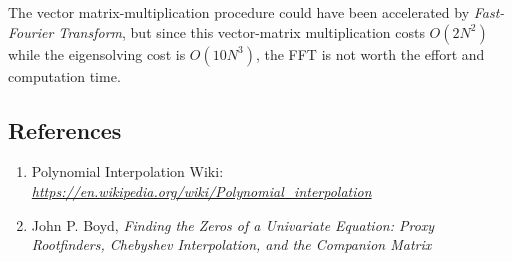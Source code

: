 \documentclass[12pt]{article}
\begin{document}
The vector matrix-multiplication procedure could have been accelerated by \textit{Fast-Fourier Transform},
	but since this vector-matrix multiplication costs $O(2N^2)$ while the eigensolving cost is $O(10N^3)$, the FFT is not worth the effort and computation time.

\subsection*{References}
\begin{enumerate}
	\item Polynomial Interpolation Wiki: \href{https://en.wikipedia.org/wiki/Polynomial_interpolation}{\textit{https://en.wikipedia.org/wiki/Polynomial\_interpolation}}
	\item John P. Boyd,  \textit{Finding the Zeros of a Univariate Equation: Proxy Rootfinders, Chebyshev Interpolation, and the Companion Matrix}
\end{enumerate}

\pagebreak
\end{document}
